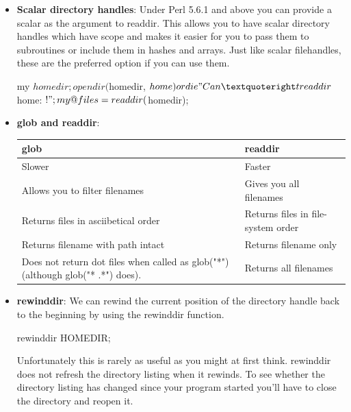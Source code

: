 \documentclass{report}
\begin{document}
\begin{itemize}
\begin{perlcode}
                closedir HOMEDIR;
            \end{perlcode}
        \item \textbf{Scalar directory handles}: Under Perl 5.6.1 and above you can provide a scalar as the argument to readdir. This allows you to have scalar directory handles which have scope and makes it easier for you to pass them to subroutines or include them in hashes and arrays. Just like scalar filehandles, these are the preferred option if you can use them.
            \bigbreak \noindent 
            \begin{perlcode}
                my $homedir;
                opendir($homedir, $home) or die "Can’t read dir $home: $!";
                my @files = readdir($homedir);
            \end{perlcode}
        \item \textbf{glob and readdir}: 
            \begin{center}
                \begin{tabularx}{\textwidth}{@{}XX@{}}
                    \toprule
                    \textbf{glob}& \textbf{readdir} \\
                    \midrule
                    Slower &Faster\\[2ex]
                    Allows you to filter filenames &Gives you all filenames\\[2ex]
                    Returns files in asciibetical order &Returns files in file-system order\\[2ex]
                    Returns filename with path intact &Returns filename only\\[2ex]
                    Does not return dot files when called as glob("*") (although glob("* .*") does). &Returns all filenames \\
                    \bottomrule
                \end{tabularx}
            \end{center}
        \item \textbf{rewinddir}: We can rewind the current position of the directory handle back to the beginning by using the rewinddir function.
            \bigbreak \noindent 
            \begin{perlcode}
            rewinddir HOMEDIR;
            \end{perlcode}
            \bigbreak \noindent 
            Unfortunately this is rarely as useful as you might at first think. rewinddir does not refresh the directory listing when it rewinds. To see whether the directory listing has changed since your program started you’ll have to close the directory and reopen it.

    \end{itemize}
\end{document}
